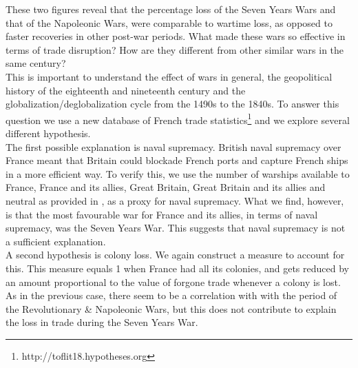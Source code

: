 \documentclass[12pt,a4paper,notitlepage]{article}
\begin{document}
These two figures reveal that the percentage loss of the Seven Years Wars and that of the Napoleonic Wars, were comparable to wartime loss, as opposed to faster recoveries in other post-war periods. What made these wars so effective in terms of trade disruption? How are they different from other similar wars in the same century?  \\
This is important to understand the effect of wars in general, the geopolitical history of the eighteenth and nineteenth century and the globalization/deglobalization cycle from the 1490s to the 1840s.
To answer this question we use a new database of French trade statistics\footnote{http://toflit18.hypotheses.org} and we explore several different hypothesis. \\
The first possible explanation is naval supremacy. British naval supremacy over France meant that Britain could blockade French ports and capture French ships in a more efficient way. To verify this, we use the number of warships available to France, France and its allies, Great Britain, Great Britain and its allies and neutral as provided in \cite{modelski1988seapower}, as a proxy for naval supremacy. What we find, however, is that the most favourable war for France and its allies, in terms of naval supremacy, was the Seven Years War. This suggests that naval supremacy is not a sufficient explanation. \\ 
A second hypothesis is colony loss. We again construct a measure to account for this. This measure equals 1 when France had all its colonies, and gets reduced by an amount proportional to the value of forgone trade whenever a colony is lost. As in the previous case, there seem to be a correlation with with the period of the Revolutionary \& Napoleonic Wars, but this does not contribute to explain the loss in trade during the Seven Years War. \\
\end{document}

